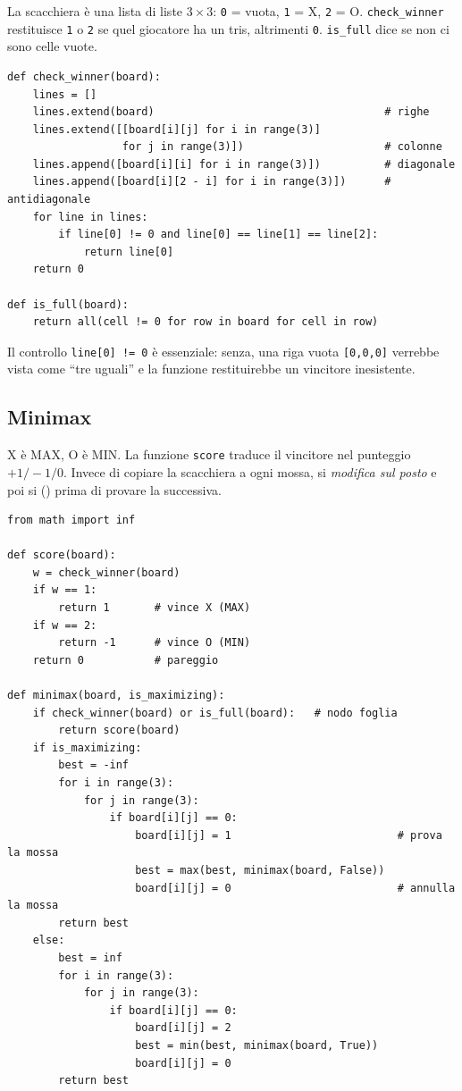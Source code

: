 La scacchiera è una lista di liste $3\times3$: \texttt{0} = vuota, \texttt{1} = X, \texttt{2} = O.
\texttt{check\_winner} restituisce \texttt{1} o \texttt{2} se quel giocatore ha un tris,
altrimenti \texttt{0}. \texttt{is\_full} dice se non ci sono celle vuote.

\begin{lstlisting}
def check_winner(board):
    lines = []
    lines.extend(board)                                    # righe
    lines.extend([[board[i][j] for i in range(3)]
                  for j in range(3)])                      # colonne
    lines.append([board[i][i] for i in range(3)])          # diagonale
    lines.append([board[i][2 - i] for i in range(3)])      # antidiagonale
    for line in lines:
        if line[0] != 0 and line[0] == line[1] == line[2]:
            return line[0]
    return 0

def is_full(board):
    return all(cell != 0 for row in board for cell in row)
\end{lstlisting}

\begin{attenzione}
Il controllo \texttt{line[0] != 0} è essenziale: senza, una riga vuota \texttt{[0,0,0]}
verrebbe vista come ``tre uguali'' e la funzione restituirebbe un vincitore inesistente.
\end{attenzione}

\subsection{Minimax}

X è MAX, O è MIN. La funzione \texttt{score} traduce il vincitore nel punteggio $+1/-1/0$.
Invece di copiare la scacchiera a ogni mossa, si \emph{modifica sul posto} e poi si
 () prima di provare la successiva.

\begin{lstlisting}
from math import inf

def score(board):
    w = check_winner(board)
    if w == 1:
        return 1       # vince X (MAX)
    if w == 2:
        return -1      # vince O (MIN)
    return 0           # pareggio

def minimax(board, is_maximizing):
    if check_winner(board) or is_full(board):   # nodo foglia
        return score(board)
    if is_maximizing:
        best = -inf
        for i in range(3):
            for j in range(3):
                if board[i][j] == 0:
                    board[i][j] = 1                          # prova la mossa
                    best = max(best, minimax(board, False))
                    board[i][j] = 0                          # annulla la mossa
        return best
    else:
        best = inf
        for i in range(3):
            for j in range(3):
                if board[i][j] == 0:
                    board[i][j] = 2
                    best = min(best, minimax(board, True))
                    board[i][j] = 0
        return best
\end{lstlisting}

